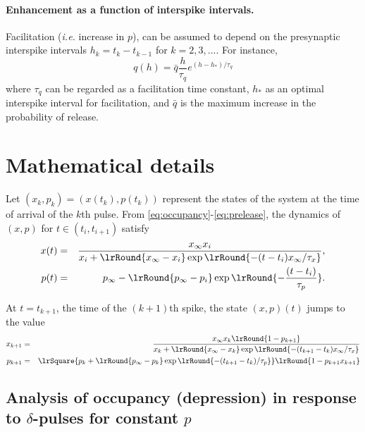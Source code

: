 \documentclass[11pt,landscape]{article}
\begin{document}
\paragraph{Enhancement as a function of interspike intervals.}
Facilitation (\textit{i.e.} increase in $p$), can be assumed
to depend on the presynaptic interspike intervals $h_k=t_{k} -t_{k-1}$ for $k=2,3,...$. 
For instance, 
\begin{equation}
q(h)= \bar{q} \frac{h}{\tau_q}   e^{(h-h_{*})/\tau_q}
\end{equation}
where $\tau_q$ can be regarded as a facilitation time constant, $h_*$
as an optimal interspike interval for facilitation, and
$\bar{q}$ is the maximum increase in the probability of release. 
 





\newpage
\section{Mathematical details}


Let $(x_k,p_k) = (x(t_k),p(t_k))$ represent the states of the system
at the time of arrival of the $k$th pulse.
From \eqref{eq:occupancy}-\eqref{eq:prelease}, the dynamics of $(x,p)$
for $t \in (t_i, t_{i+1})$ satisfy 
\begin{eqnarray}
x(t) 
&=& \frac{x_{\infty} {x_i}}{{x_i} + \lrRound{x_{\infty}- x_i}
\exp\lrRound{- (t-t_i) x_{\infty} / \tau_x }},
\label{xLogisticSolution}
\\
p(t) 
&=& p_{\infty} - \lrRound{p_{\infty}- p_i}
   \exp\lrRound{-\frac{(t-t_i)}{\tau_p}}. 
\label{pLinearSolution}
\end{eqnarray}

At $t=t_{k+1}$, the time of the $(k+1)$th 
spike,  the state $(x,p)(t)$ jumps to the value 
\begin{eqnarray}
x_{k+1} 
&=& \frac{x_{\infty} {x_{k}}  \lrRound{1-p_{k+1}} }{{x_{k}} + \lrRound{x_{\infty}- x_{k}}
\exp\lrRound{- (t_{k+1}-t_{k}) x_{\infty} / \tau_x }}
\\
p_{k+1} 
&=& \lrSquare{{p_{k}} + \lrRound{p_{\infty}- p_{k}}
\exp\lrRound{- (t_{k+1}-t_{k})  / \tau_p }} \lrRound{1-p_{k+1} x_{k+1}}
\end{eqnarray}

\subsection{Analysis of occupancy  (depression) in response to
  $\delta$-pulses for constant $p$}
\end{document}
